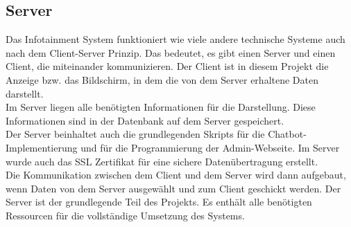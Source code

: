 \subsection{Server}
Das Infotainment System funktioniert wie viele andere technische Systeme auch nach dem Client-Server Prinzip. Das bedeutet, es gibt einen Server und einen Client, die miteinander kommunizieren. Der Client ist in diesem Projekt die Anzeige bzw. das Bildschirm, in dem die von dem Server erhaltene Daten darstellt. \\
Im Server liegen alle benötigten Informationen für die Darstellung. Diese Informationen sind in der Datenbank auf dem Server gespeichert.\\
Der Server beinhaltet auch die grundlegenden Skripts für die Chatbot-Implementierung und für die Programmierung der Admin-Webseite. Im Server wurde auch das SSL Zertifikat für eine sichere Datenübertragung erstellt.\\
Die Kommunikation zwischen dem Client und dem Server wird dann aufgebaut, wenn Daten von dem Server ausgewählt und zum Client geschickt werden. 
Der Server ist der grundlegende Teil des Projekts. Es enthält alle benötigten Ressourcen für die vollständige Umsetzung des Systems.
